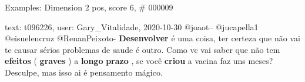 \begin{frame}{Examples: Dimension 2 pos, score 6, \# 000009}
\footnotesize
\begin{exampleblock}{text: t096226, user: Gary\_Vitalidade, 2020-10-30}
@joaot-- @jucapella1 @eisuelencruz @RenanPeixoto- \textbf{Desenvolver} é uma 
coisa, ter certeza que não vai te causar sérios problemas de saude é outro. 
Como vc vai saber que não tem \textbf{efeitos} ( \textbf{graves} ) a 
\textbf{longo} \textbf{prazo} , se você \textbf{criou} a vacina faz uns meses? 
Desculpe, mas isso ai é pensamento mágico. 
\end{exampleblock}
\end{frame}
